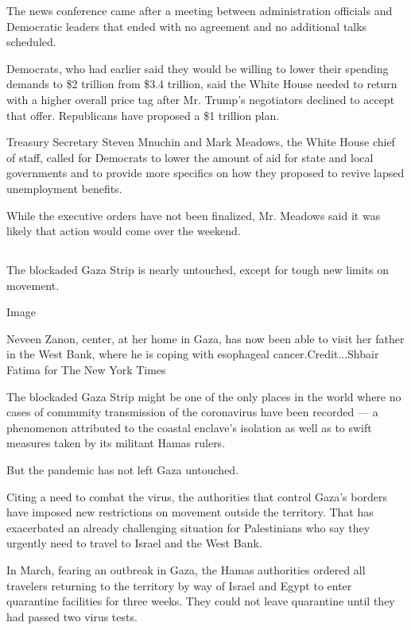 The news conference came after a meeting between administration
officials and Democratic leaders that ended with no agreement and no
additional talks scheduled.

Democrats, who had earlier said they would be willing to lower their
spending demands to \$2 trillion from \$3.4 trillion, said the White
House needed to return with a higher overall price tag after Mr. Trump's
negotiators declined to accept that offer. Republicans have proposed a
\$1 trillion plan.

Treasury Secretary Steven Mnuchin and Mark Meadows, the White House
chief of staff, called for Democrats to lower the amount of aid for
state and local governments and to provide more specifics on how they
proposed to revive lapsed unemployment benefits.

While the executive orders have not been finalized, Mr. Meadows said it
was likely that action would come over the weekend.

\hypertarget{section-2}{%
\subsection{}\label{section-2}}

The blockaded Gaza Strip is nearly untouched, except for tough new
limits on movement.

Image

Neveen Zanon, center, at her home in Gaza, has now been able to visit
her father in the West Bank, where he is coping with esophageal
cancer.Credit...Shbair Fatima for The New York Times

The blockaded Gaza Strip might be one of the only places in the world
where no cases of community transmission of the coronavirus have been
recorded --- a phenomenon attributed to the coastal enclave's isolation
as well as to swift measures taken by its militant Hamas rulers.

But the pandemic has not left Gaza untouched.

Citing a need to combat the virus, the authorities that control Gaza's
borders have imposed new restrictions on movement outside the territory.
That has exacerbated an already challenging situation for Palestinians
who say they urgently need to travel to Israel and the West Bank.

In March, fearing an outbreak in Gaza, the Hamas authorities ordered all
travelers returning to the territory by way of Israel and Egypt to enter
quarantine facilities for three weeks. They could not leave quarantine
until they had passed two virus tests.

